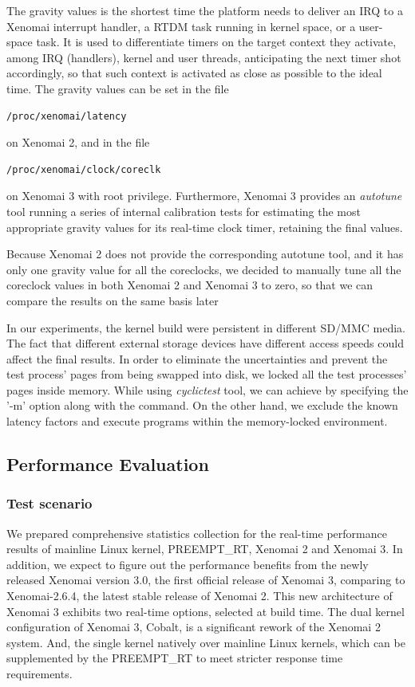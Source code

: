 \documentclass[10pt,a4paper]{article}
\begin{document}
\begin{multicols}{2}
  The gravity values is the shortest time the platform needs to deliver an IRQ to a Xenomai interrupt handler, a RTDM task running in kernel space, or a user-space task. It is used to differentiate timers on the target context they activate, among IRQ (handlers), kernel and user threads, anticipating the next timer shot accordingly, so that such context is activated as close as possible to the ideal time. The gravity values can be set in the file \begin{verbatim}/proc/xenomai/latency
\end{verbatim} on Xenomai 2, and in the file
\begin{verbatim}/proc/xenomai/clock/coreclk
\end{verbatim} on Xenomai 3 with root privilege. Furthermore, Xenomai 3 provides an \textit{autotune} tool running a series of internal calibration tests for estimating the most appropriate gravity values for its real-time clock timer, retaining the final values.

Because Xenomai 2 does not provide the corresponding autotune tool, and it has only one gravity value for all the coreclocks, we decided to manually tune all the coreclock values in both Xenomai 2 and Xenomai 3 to zero, so that we can compare the results on the same basis later

In our experiments, the kernel build were persistent in different SD/MMC media. The fact that different external storage devices have different access speeds could affect the final results. In order to eliminate the uncertainties and prevent the test process' pages from being swapped into disk, we locked all the test processes' pages inside memory. While using \textit{cyclictest} tool, we can achieve by specifying the '-m' option along with the command. On the other hand, we exclude the known latency factors and execute programs within the memory-locked environment.

\subsection{Performance Evaluation}

\subsubsection{Test scenario}
We prepared comprehensive statistics collection for the real-time performance results of mainline Linux kernel, PREEMPT\_RT, Xenomai 2 and Xenomai 3. In addition, we expect to figure out the performance benefits from the newly released Xenomai version 3.0, the first official release of Xenomai 3, comparing to Xenomai-2.6.4, the latest stable release of Xenomai 2. This new architecture of Xenomai 3 exhibits two real-time options, selected at build time. The dual kernel configuration of Xenomai 3, Cobalt, is a significant rework of the Xenomai 2 system. And, the single kernel natively over mainline Linux kernels, which can be supplemented by the PREEMPT\_RT to meet stricter response time requirements.


\end{multicols}
\end{document}
